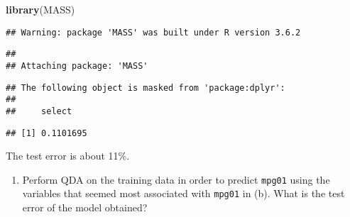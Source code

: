 \documentclass[]{article}
\newenvironment{Shaded}{\begin{snugshade}}{\end{snugshade}}
\newcommand{\CommentTok}[1]{\textcolor[rgb]{0.56,0.35,0.01}{\textit{#1}}}
\newcommand{\DataTypeTok}[1]{\textcolor[rgb]{0.13,0.29,0.53}{#1}}
\newcommand{\KeywordTok}[1]{\textcolor[rgb]{0.13,0.29,0.53}{\textbf{#1}}}
\newcommand{\NormalTok}[1]{#1}
\newcommand{\OperatorTok}[1]{\textcolor[rgb]{0.81,0.36,0.00}{\textbf{#1}}}
\newcommand{\StringTok}[1]{\textcolor[rgb]{0.31,0.60,0.02}{#1}}
\providecommand{\tightlist}{%
  \setlength{\itemsep}{0pt}\setlength{\parskip}{0pt}}
\begin{document}
\begin{Shaded}
\begin{Highlighting}[]
\KeywordTok{library}\NormalTok{(MASS)}
\end{Highlighting}
\end{Shaded}

\begin{verbatim}
## Warning: package 'MASS' was built under R version 3.6.2
\end{verbatim}

\begin{verbatim}
## 
## Attaching package: 'MASS'
\end{verbatim}

\begin{verbatim}
## The following object is masked from 'package:dplyr':
## 
##     select
\end{verbatim}

\begin{Shaded}
\end{Shaded}

\begin{verbatim}
## [1] 0.1101695
\end{verbatim}

The test error is about 11\%.

\begin{enumerate}
\def\labelenumi{(\alph{enumi})}
\setcounter{enumi}{4}
\tightlist
\item
  Perform QDA on the training data in order to predict \texttt{mpg01}
  using the variables that seemed most associated with \texttt{mpg01} in
  (b). What is the test error of the model obtained?
\end{enumerate}
\end{document}
